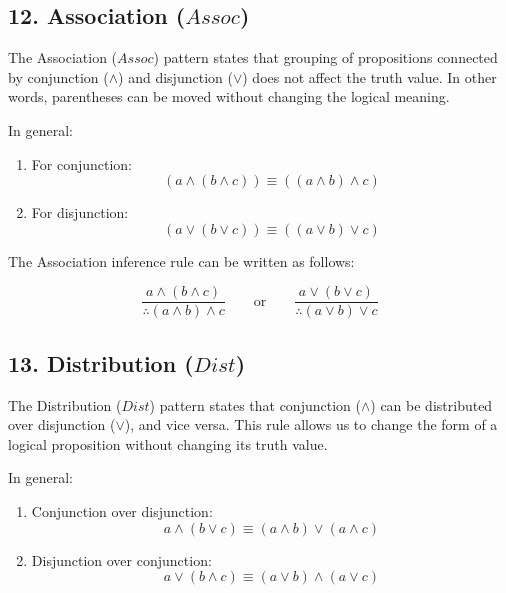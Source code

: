 \subsection{\texorpdfstring{12. Association
(\(Assoc\))}{12. Association (Assoc)}}\label{association-assoc}

The Association (\(Assoc\)) pattern states that grouping of propositions
connected by conjunction (\(\land\)) and disjunction (\(\lor\)) does not
affect the truth value. In other words, parentheses can be moved without
changing the logical meaning.

In general:

\begin{enumerate}
\def\labelenumi{\arabic{enumi}.}
\item
  For conjunction:\\
  \[(a \land (b \land c)) \equiv ((a \land b) \land c)\]
\item
  For disjunction:\\
  \[(a \lor (b \lor c)) \equiv ((a \lor b) \lor c)\]
\end{enumerate}

The Association inference rule can be written as follows:

\[
\frac{a \land (b \land c)}{\therefore (a \land b) \land c}
\qquad \text{or} \qquad
\frac{a \lor (b \lor c)}{\therefore (a \lor b) \lor c}
\]

\subsection{\texorpdfstring{13. Distribution
(\(Dist\))}{13. Distribution (Dist)}}\label{distribution-dist}

The Distribution (\(Dist\)) pattern states that conjunction (\(\land\))
can be distributed over disjunction (\(\lor\)), and vice versa. This
rule allows us to change the form of a logical proposition without
changing its truth value.

In general:

\begin{enumerate}
\def\labelenumi{\arabic{enumi}.}
\item
  Conjunction over disjunction:\\
  \[a \land (b \lor c) \equiv (a \land b) \lor (a \land c)\]
\item
  Disjunction over conjunction:\\
  \[a \lor (b \land c) \equiv (a \lor b) \land (a \lor c)\]
\end{enumerate}

